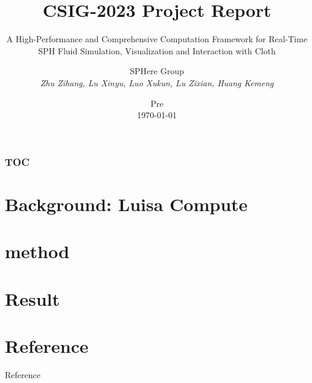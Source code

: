 \documentclass[10pt, hyperref={colorlinks=true,linkcolor=blue},xcolor=dvipsnames]{beamer}
\title[title]{ CSIG-2023 Project Report }
\subtitle{A High-Performance and Comprehensive Computation Framework for Real-Time SPH Fluid Simulation, Visualization and Interaction with Cloth}
\author[SPHere Group]{\texorpdfstring{SPHere Group \\ \smallskip \textit{Zhu Zihang, Lu Xinyu, Luo Xukun, Lu Zixian, Huang Kemeng}}{}}
\date[\today]{\texorpdfstring{Pre \\ \today}{}}
\begin{document}
\begin{frame}
    \titlepage
\end{frame}



\begin{frame}
    \frametitle{TOC}
    \tableofcontents
\end{frame}



\section{Background: Luisa Compute}

\section{method}

\section{Result}


\section{Reference}

\begin{frame}[allowframebreaks]{Reference}
    
    
\end{frame}
\end{document}
